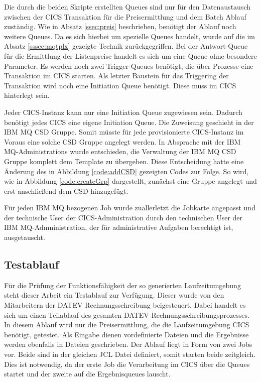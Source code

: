 Die durch die beiden Skripte erstellten Queues sind nur für den Datenaustausch zwischen der CICS Transaktion für die Preisermittlung und dem Batch Ablauf zuständig.
Wie in Absatz \ref{ssec:preis} beschrieben, benötigt der Ablauf noch weitere Queues.
Da es sich hierbei um spezielle Queues handelt, wurde auf die im Absatz \ref{sssec:mqtplx} gezeigte Technik zurückgegriffen.
Bei der Antwort-Queue für die Ermittlung der Listenpreise handelt es sich um eine Queue ohne besondere Parameter.
Es werden noch zwei Trigger-Queues benötigt, die über Prozesse eine Transaktion im CICS starten.
Als letzter Baustein für das Triggering der Transaktion wird noch eine Initiation Queue benötigt.
Diese muss im CICS hinterlegt sein.

Jeder CICS-Instanz kann nur eine Initiation Queue zugewiesen sein.
Dadurch benötigt jedes CICS eine eigene Initiation Queue.
Die Zuweisung geschieht in der IBM MQ CSD Gruppe.
Somit müsste für jede provisionierte CICS-Instanz im Voraus eine solche CSD Gruppe angelegt werden.
In Absprache mit der IBM MQ-Administrations  wurde entschieden, die Verwaltung der IBM MQ CSD Gruppe komplett dem Template zu übergeben.
Diese Entscheidung hatte eine Änderung des in Abbildung \ref{code:addCSD} gezeigten Codes zur Folge.
So wird, wie in Abbildung \ref{code:createGrp} dargestellt, zunächst eine Gruppe angelegt und erst anschließend dem CSD hinzugefügt.

\begin{minipage}{\linewidth}

\end{minipage}

Für jeden IBM MQ bezogenen Job wurde zuallerletzt die Jobkarte angepasst und der technische User der CICS-Administration durch den technischen User der IBM MQ-Admninistration, der für administrative Aufgaben berechtigt ist, ausgetauscht.

\subsection{Testablauf}
Für die Prüfung der Funktionsfähigkeit der so generierten Laufzeitumgebung steht dieser Arbeit ein Testablauf zur Verfügung.
Dieser wurde von den Mitarbeitern der DATEV Rechnungsschreibung beigesteuert.
Dabei handelt es sich um einen Teilablauf des gesamten DATEV Rechnungsschreibungsprozesses.
In diesem Ablauf wird nur die Preisermittlung, die die Laufzeitumgebung CICS benötigt, getestet.
Als Eingabe dienen vordefinierte Dateien und die Ergebnisse werden ebenfalls in Dateien geschrieben.
Der Ablauf liegt in Form von zwei Jobs vor.
Beide sind in der gleichen JCL Datei definiert, somit starten beide zeitgleich.
Dies ist notwendig, da der erste Job die Verarbeitung im CICS über die Queues startet und der zweite auf die Ergebnisqueues lauscht.

